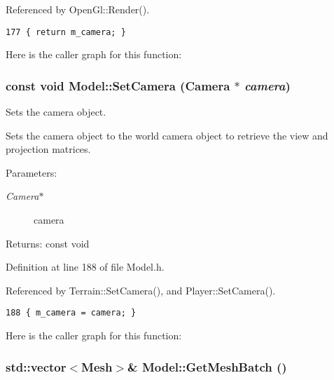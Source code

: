 Referenced by OpenGl::Render().

\begin{Code}\begin{verbatim}177 { return m_camera; }
\end{verbatim}
\end{Code}




Here is the caller graph for this function:\hypertarget{class_model_5efc69bc9e86c4946aec2be4b190351f}{
\subsubsection[SetCamera]{\setlength{\rightskip}{0pt plus 5cm}const void Model::SetCamera ({\bf Camera} $\ast$ {\em camera})}}
\label{class_model_5efc69bc9e86c4946aec2be4b190351f}


Sets the camera object. 

Sets the camera object to the world camera object to retrieve the view and projection matrices.

\begin{Desc}
\item[Parameters:]
\begin{description}
\item[{\em Camera$\ast$}]camera \end{description}
\end{Desc}
\begin{Desc}
\item[Returns:]const void \end{Desc}


Definition at line 188 of file Model.h.

Referenced by Terrain::SetCamera(), and Player::SetCamera().

\begin{Code}\begin{verbatim}188 { m_camera = camera; }
\end{verbatim}
\end{Code}




Here is the caller graph for this function:\hypertarget{class_model_e8189e0eb940a7a994591ca71dafae5b}{
\subsubsection[GetMeshBatch]{\setlength{\rightskip}{0pt plus 5cm}std::vector$<${\bf Mesh}$>$\& Model::GetMeshBatch ()}}
\label{class_model_e8189e0eb940a7a994591ca71dafae5b}


